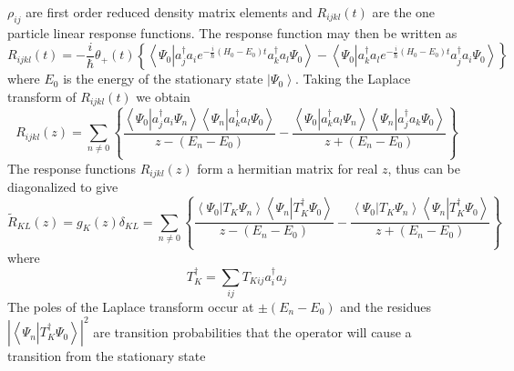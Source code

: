 \documentclass[aps,preprint]{revtex4}%
\begin{document}
$\rho_{ij}$ are first order reduced density matrix elements and $R_{ijkl}%
\left(  t\right)  $ are the one particle linear response functions. The
response function may then be written as
\begin{equation}
R_{ijkl}\left(  t\right)  =-\frac{i}{\hslash}\theta_{+}\left(  t\right)
\left\{  \left\langle \Psi_{0}\left\vert a_{j}^{\dagger}a_{i}e^{-\frac
{i}{\hslash}\left(  H_{0}-E_{0}\right)  t}a_{k}^{\dagger}a_{l}\right.
\Psi_{0}\right\rangle -\left\langle \Psi_{0}\left\vert a_{k}^{\dagger}%
a_{l}e^{-\frac{i}{\hslash}\left(  H_{0}-E_{0}\right)  t}a_{j}^{\dagger}%
a_{i}\right.  \Psi_{0}\right\rangle \right\}
\end{equation}
where $E_{0}$ is the energy of the stationary state $\left\vert \Psi
_{0}\right\rangle $. Taking the Laplace transform of $R_{ijkl}\left(
t\right)  $ we obtain
\begin{equation}
R_{ijkl}\left(  z\right)  =\sum_{n\neq0}\left\{  \frac{\left\langle \Psi
_{0}\left\vert a_{j}^{\dagger}a_{i}\Psi_{n}\right.  \right\rangle \left\langle
\Psi_{n}\left\vert a_{k}^{\dagger}a_{l}\Psi_{0}\right.  \right\rangle
}{z-\left(  E_{n}-E_{0}\right)  }-\frac{\left\langle \Psi_{0}\left\vert
a_{k}^{\dagger}a_{l}\Psi_{n}\right.  \right\rangle \left\langle \Psi
_{n}\left\vert a_{j}^{\dagger}a_{k}\Psi_{0}\right.  \right\rangle }{z+\left(
E_{n}-E_{0}\right)  }\right\}
\end{equation}
The response functions $R_{ijkl}\left(  z\right)  $ form a hermitian matrix
for real $z$, thus can be diagonalized to give
\begin{equation}
\tilde{R}_{KL}\left(  z\right)  =g_{K}\left(  z\right)  \delta_{KL}%
=\sum_{n\neq0}\left\{  \frac{\left\langle \Psi_{0}\left\vert T_{K}\Psi
_{n}\right.  \right\rangle \left\langle \Psi_{n}\left\vert T_{K}^{\dagger}%
\Psi_{0}\right.  \right\rangle }{z-\left(  E_{n}-E_{0}\right)  }%
-\frac{\left\langle \Psi_{0}\left\vert T_{K}\Psi_{n}\right.  \right\rangle
\left\langle \Psi_{n}\left\vert T_{K}^{\dagger}\Psi_{0}\right.  \right\rangle
}{z+\left(  E_{n}-E_{0}\right)  }\right\}
\end{equation}
where
\begin{equation}
T_{K}^{\dagger}=\sum_{ij}T_{Kij}a_{i}^{\dagger}a_{j}%
\end{equation}
The poles of the Laplace transform occur at $\pm\left(  E_{n}-E_{0}\right)  $
and the residues $\left\vert \left\langle \Psi_{n}\left\vert T_{K}^{\dagger
}\Psi_{0}\right.  \right\rangle \right\vert ^{2}$ are transition probabilities
that the operator will cause a transition from the stationary state
\end{document}
